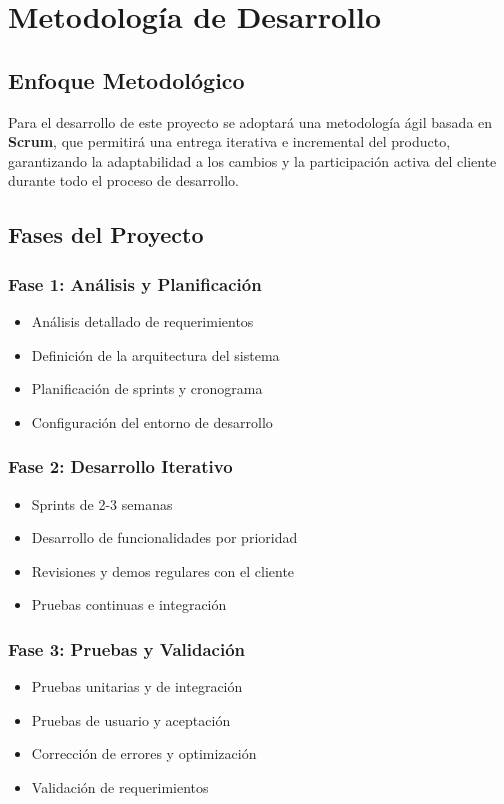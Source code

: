 \section{Metodología de Desarrollo}

\subsection{Enfoque Metodológico}

Para el desarrollo de este proyecto se adoptará una metodología ágil basada en \textbf{Scrum}, que permitirá una entrega iterativa e incremental del producto, garantizando la adaptabilidad a los cambios y la participación activa del cliente durante todo el proceso de desarrollo.

\subsection{Fases del Proyecto}

\subsubsection{Fase 1: Análisis y Planificación}
\begin{itemize}
    \item Análisis detallado de requerimientos
    \item Definición de la arquitectura del sistema
    \item Planificación de sprints y cronograma
    \item Configuración del entorno de desarrollo
\end{itemize}

\subsubsection{Fase 2: Desarrollo Iterativo}
\begin{itemize}
    \item Sprints de 2-3 semanas
    \item Desarrollo de funcionalidades por prioridad
    \item Revisiones y demos regulares con el cliente
    \item Pruebas continuas e integración
\end{itemize}

\subsubsection{Fase 3: Pruebas y Validación}
\begin{itemize}
    \item Pruebas unitarias y de integración
    \item Pruebas de usuario y aceptación
    \item Corrección de errores y optimización
    \item Validación de requerimientos
\end{itemize}

